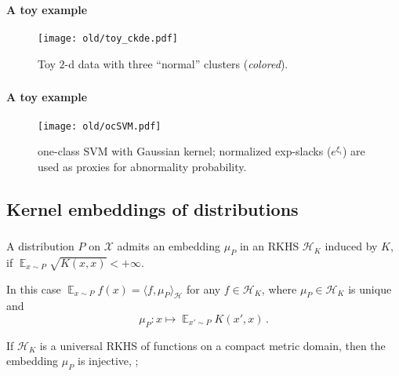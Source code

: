 \documentclass[t]{beamer}  %
\newcommand{\Xcal}{\mathcal{X}}
\newcommand{\Hcal}{\mathcal{H}}
\newcommand{\ex}{\mathop{\mathbb{E}}\nolimits}
\begin{document}
\begin{frame}[c]\frametitle{\insertsection}
  \framesubtitle{A toy example}
  \begin{figure}%
    \centering
    \texttt{[image: old/toy\_ckde.pdf]}
    \caption{Toy $2$-d data with three ``normal'' clusters (\textit{colored}).}
    \label{fig:toy}
  \end{figure}
\end{frame}

\begin{frame}[c]\frametitle{\insertsection}
  \framesubtitle{A toy example}
  \begin{figure}%
    \centering
    \texttt{[image: old/ocSVM.pdf]}
    \caption{one-class SVM with Gaussian kernel; normalized exp-slacks ($e^{\xi_i}$)
    are used as proxies for abnormality probability.}
    \label{fig:ocsvm}
  \end{figure}
\end{frame}

\subsection{Kernel embeddings of distributions} %
\label{sub:kernel_embeddings_of_distributions}

\begin{frame}[c]\frametitle{\insertsection}
  \framesubtitle{\insertsubsection}
  A distribution $P$ on $\Xcal$ admits an embedding $\mu_P$ in an RKHS $\Hcal_K$
  induced by $K$, if $\ex_{x\sim P} \sqrt{K(x,x)} < +\infty$.
  
  \vspace{\baselineskip}
  In this case $\ex_{x\sim P} f(x) = \langle f, \mu_P \rangle_\Hcal$ for any
  $f\in \Hcal_K$, where $\mu_P\in \Hcal_K$ is unique and
  $$ \mu_P: x \mapsto \ex_{x'\sim P} K(x', x) \,. $$
  
  \vspace{\baselineskip}
  If $\Hcal_K$ is a universal RKHS of functions on a compact metric domain, then
  the embedding $\mu_P$ is injective, \cite{gretton2012};
\end{frame}
\end{document}
